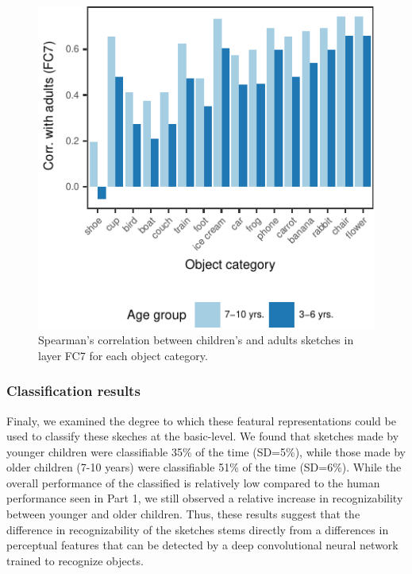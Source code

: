 \documentclass[10pt, letterpaper]{article}
\newenvironment{CodeChunk}{}{}
\begin{document}
\begin{CodeChunk}
\begin{figure}[H]

{\centering \includegraphics{figs/simpleCorr-1} 

}

\caption[Spearman's correlation between children's and adults sketches in layer FC7 for each object category]{Spearman's correlation between children's and adults sketches in layer FC7 for each object category.}\label{fig:simpleCorr}
\end{figure}
\end{CodeChunk}

\subsubsection{Classification results}\label{classification-results}

Finaly, we examined the degree to which these featural representations
could be used to classify these skeches at the basic-level. We found
that sketches made by younger children were classifiable 35\% of the
time (SD=5\%), while those made by older children (7-10 years) were
classifiable 51\% of the time (SD=6\%). While the overall performance of
the classified is relatively low compared to the human performance seen
in Part 1, we still observed a relative increase in recognizability
between younger and older children. Thus, these results suggest that the
difference in recognizability of the sketches stems directly from a
differences in perceptual features that can be detected by a deep
convolutional neural network trained to recognize objects.
\end{document}
